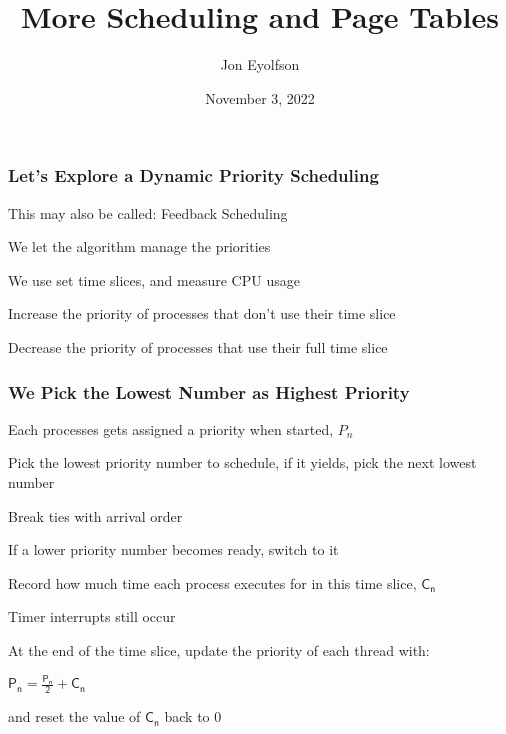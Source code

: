

\title{More Scheduling and Page Tables}
\author{Jon Eyolfson}
\date{November 3, 2022}


  \begin{frame}
    \titlepage
  \end{frame}

  \begin{frame}
    \frametitle{Let's Explore a Dynamic Priority Scheduling}

    This may also be called: Feedback Scheduling

    \vspace{2em}

    We let the algorithm manage the priorities

    \hspace{2em} We use set time slices, and measure CPU usage

    \vspace{2em}

    Increase the priority of processes that don't use their time slice

    \vspace{2em}

    Decrease the priority of processes that use their full time slice
  \end{frame}

  \begin{frame}
    \frametitle{We Pick the Lowest Number as Highest Priority}

    Each processes gets assigned a priority when started, $P_n$

    \vspace{2em}

    Pick the lowest priority number to schedule, if it yields, pick the
    next lowest number

    \hspace{2em} Break ties with arrival order
    
    \hspace{2em} If a lower priority number becomes ready, switch to it

    \vspace{2em}

    Record how much time each process executes for in this time slice,
    $\mathsf{C_n}$

    \hspace{2em} Timer interrupts still occur
  
    \vspace{2em}

    At the end of the time slice, update the priority of each thread with:

    \hspace{2em} $\mathsf{P_n =  \frac{P_n}{2} + C_n}$ 

    \hspace{2em} and reset the value of $\mathsf{C_n}$ back to 0
  \end{frame}

